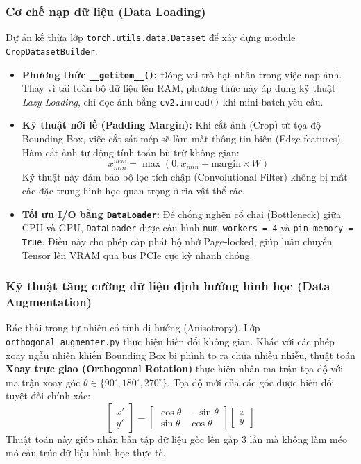 \documentclass[12pt, a4paper]{article}
\begin{document}
\subsubsection{Cơ chế nạp dữ liệu (Data Loading)}
Dự án kế thừa lớp \texttt{torch.utils.data.Dataset} để xây dựng module \texttt{CropDatasetBuilder}.
\begin{itemize}
    \item \textbf{Phương thức \texttt{\_\_getitem\_\_()}:} Đóng vai trò hạt nhân trong việc nạp ảnh. Thay vì tải toàn bộ dữ liệu lên RAM, phương thức này áp dụng kỹ thuật \textit{Lazy Loading}, chỉ đọc ảnh bằng \texttt{cv2.imread()} khi mini-batch yêu cầu.
    \item \textbf{Kỹ thuật nới lề (Padding Margin):} Khi cắt ảnh (Crop) từ tọa độ Bounding Box, việc cắt sát mép sẽ làm mất thông tin biên (Edge features). Hàm cắt ảnh tự động tính toán bù trừ không gian:
    \begin{equation}
        x_{min}^{new} = \max(0, x_{min} - \text{margin} \times W)
    \end{equation}
    Kỹ thuật này đảm bảo bộ lọc tích chập (Convolutional Filter) không bị mất các đặc trưng hình học quan trọng ở rìa vật thể rác.
    \item \textbf{Tối ưu I/O bằng \texttt{DataLoader}:} Để chống nghẽn cổ chai (Bottleneck) giữa CPU và GPU, \texttt{DataLoader} được cấu hình \texttt{num\_workers = 4} và \texttt{pin\_memory = True}. Điều này cho phép cấp phát bộ nhớ Page-locked, giúp luân chuyển Tensor lên VRAM qua bus PCIe cực kỳ nhanh chóng.
\end{itemize}

\subsubsection{Kỹ thuật tăng cường dữ liệu định hướng hình học (Data Augmentation)}
Rác thải trong tự nhiên có tính dị hướng (Anisotropy). Lớp \texttt{orthogonal\_augmenter.py} thực hiện biến đổi không gian. Khác với các phép xoay ngẫu nhiên khiến Bounding Box bị phình to ra chứa nhiều nhiễu, thuật toán \textbf{Xoay trực giao (Orthogonal Rotation)} thực hiện nhân ma trận tọa độ với ma trận xoay góc $\theta \in \{90^\circ, 180^\circ, 270^\circ\}$. Tọa độ mới của các góc được biến đổi tuyệt đối chính xác:
\begin{equation}
    \begin{bmatrix} x' \\ y' \end{bmatrix} = \begin{bmatrix} \cos\theta & -\sin\theta \\ \sin\theta & \cos\theta \end{bmatrix} \begin{bmatrix} x \\ y \end{bmatrix}
\end{equation}
Thuật toán này giúp nhân bản tập dữ liệu gốc lên gấp 3 lần mà không làm méo mó cấu trúc dữ liệu hình học thực tế.
\end{document}

